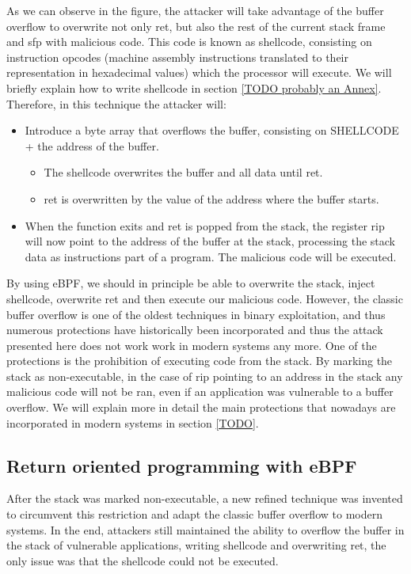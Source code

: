 \documentclass[12pt]{report} %
\begin{document}
As we can observe in the figure, the attacker will take advantage of the buffer overflow to overwrite not only ret, but also the rest of the current stack frame and sfp with malicious code. This code is known as shellcode, consisting on instruction opcodes (machine assembly instructions translated to their representation in hexadecimal values) which the processor will execute. We will briefly explain how to write shellcode in section \ref{TODO probably an Annex}. Therefore, in this technique the attacker will:
\begin{itemize}
\item Introduce a byte array that overflows the buffer, consisting on SHELLCODE + the address of the buffer.
\begin{itemize}
	\item The shellcode overwrites the buffer and all data until ret.
	\item ret is overwritten by the value of the address where the buffer starts.
\end{itemize}
\item When the function exits and ret is popped from the stack, the register rip will now point to the address of the buffer at the stack, processing the stack data as instructions part of a program. The malicious code will be executed.
\end{itemize}

By using eBPF, we should in principle be able to overwrite the stack, inject shellcode, overwrite ret and then execute our malicious code. However, the classic buffer overflow is one of the oldest techniques in binary exploitation, and thus numerous protections have historically been incorporated and thus the attack presented here does not work work in modern systems any more. One of the protections is  the prohibition of executing code from the stack. By marking the stack as non-executable, in the case of rip pointing to an address in the stack any malicious code will not be ran, even if an application was vulnerable to a buffer overflow. We will explain more in detail the main protections that nowadays are incorporated in modern systems in section \ref{TODO}.

\subsection{Return oriented programming with eBPF}
After the stack was marked non-executable, a new refined technique was invented to circumvent this restriction and adapt the classic buffer overflow to modern systems. In the end, attackers still maintained the ability to overflow the buffer in the stack of vulnerable applications, writing shellcode and overwriting ret, the only issue was that the shellcode could not be executed.
\end{document}
